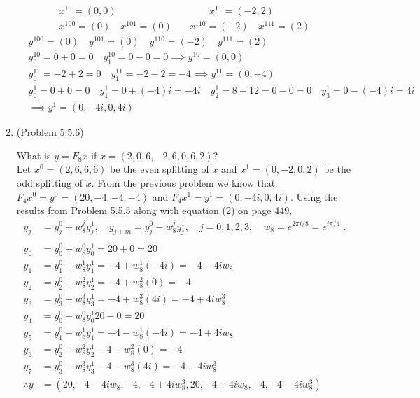 \documentclass[a4paper]{article}
\begin{document}
\begin{enumerate}
\begin{align*}
x^{10} = (0,0)  \qquad \quad & \quad \qquad x^{11} = (-2,2) \\
x^{100} = (0) \quad  x^{101} = (0) & \quad x^{110} = (-2) \quad x^{111} = (2)
\end{align*}
\begin{align*}
& y^{100} = (0) \quad  y^{101} = (0) \quad y^{110} = (-2) \quad y^{111} = (2) \\
& y^{10}_0 = 0 + 0 = 0 \quad y^{10}_1 = 0-0 = 0 \implies y^{10} = (0,0) \\
& y^{11}_0 = -2 + 2 = 0 \quad y^{11}_1 = -2 - 2 = -4 \implies  y^{11} = (0,-4) \\
&y^1_0 = 0 +0 = 0 \quad y^1_1 = 0 + (-4)i = -4i \quad y^1_2 = 8-12 = 0 - 0 = 0 \quad y^1_3 = 0 - (-4)i = 4i \\
& \implies y^1 = (0,-4i,0,4i)
\end{align*}

\item{(Problem 5.5.6)}

What is $y = F_8x$ if $x = (2,0,6,-2,6,0,6,2)$? \\

Let $x^0 = (2,6,6,6)$ be the even splitting of $x$ and $x^{1} = (0,-2,0,2)$ be the odd splitting of $x$. From the previous problem we know that $F_4x^0 = y^0 = (20,-4,-4,-4)$ and $F_4x^1 = y^1 = (0,-4i, 0, 4i)$. Using the results from Problem 5.5.5 along with equation (2) on page 449,
\begin{align*}
y_j &= y^0_j + w_8^jy^1_j, \quad y_{j+m} =  y^0_j - w_8^jy^1_j, \quad j = 0,1,2,3, \quad w_8 = e^{2\pi i/ 8} = e^{i\pi/4} \;. \\
&\\
y_0 &= y^0_0 + w_8^0y^1_0 = 20 + 0 = 20 \\
y_1 &= y^0_1 + w_8^1y^1_1 = -4 + w_8^1(-4i) = -4 - 4iw_8\\
y_2 &= y^0_2 + w_8^2y^1_2  = -4 + w_8^2(0) = -4\\
y_3 &= y^0_3 + w_8^3y^1_3 = -4 + w_8^3(4i) = -4 + 4iw_8^3  \\
y_4 &= y^0_0 - w_8^0y^1_0 20 - 0 = 20\\
y_5 &= y^0_1 - w_8^1y^1_1 = -4 - w_8^1(-4i) = -4 + 4iw_8 \\
y_6 &= y^0_2 - w_8^2y^1_2 -4 - w_8^2(0) = -4\\
y_7 &= y^0_3 - w_8^3y^1_3 -4 - w_8^3(4i) = -4 - 4iw_8^3\\
\therefore y &= (20, -4-4iw_8, -4, -4+4iw_8^3, 20, -4+4iw_8, -4, -4-4iw_8^3)
\end{align*}

\end{enumerate}
\end{document}
